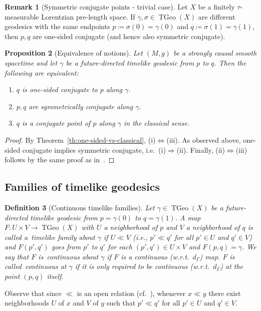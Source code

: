 \documentclass[a4paper,11pt]{article}
\numberwithin{equation}{section}
\theoremstyle{plain}
\newtheorem{Definition}{Definition}[section]
\newtheorem{Proposition}[Definition]{Proposition}
\theoremstyle{definition}
\newtheorem{Remark}[Definition]{Remark}
\DeclareMathOperator{\TGeo}{TGeo}
\begin{document}
\begin{Remark}[Symmetric conjugate points - trivial case]
Let $X$ be a finitely $\tau$-measurable
Lorentzian pre-length space. If $\gamma, \sigma \in \TGeo(X)$ are different geodesics with the same endpoints $p \coloneqq \sigma(0) = \gamma(0)$ and $q \coloneqq \sigma(1) = \gamma(1)$, then $p,q$ are one-sided conjugate (and hence also symmetric conjugate).
\end{Remark}


\begin{Proposition}[Equivalence of notions]\label{prop:equivalence_of_conjugate_notions}
Let $(M,g)$ be a strongly causal smooth spacetime and let $\gamma$ be a future-directed timelike geodesic from $p$ to $q$. Then the following are equivalent:
\begin{enumerate}
    \item[(i)] $q$ is one-sided conjugate to $p$ along $\gamma$.
    \item[(ii)] $p,q$ are symmetrically conjugate along $\gamma$.
    \item[(iii)] $q$ is a conjugate point of $p$ along $\gamma$ in the classical sense.
\end{enumerate}
\end{Proposition}
\begin{proof}
By Theorem~\ref{th:one-sided-vs-classical}, (i)$\Leftrightarrow$(iii). As observed above, one-sided conjugate implies symmetric conjugate, i.e.\ (i)$\Rightarrow$(ii). Finally, (ii)$\Leftrightarrow$(iii) follows by the same 
proof as in~\cite[Thm.\ 2.6]{shankar2009conjugate}.
\end{proof}

\subsection{Families of timelike geodesics}
\label{subsection: Families of timelike geodesics}

\begin{Definition}[Continuous timelike families]
Let $\gamma\in \TGeo(X)$ be a future-directed timelike geodesic from $p=\gamma(0)$ to $q=\gamma(1)$. A map $F \colon U\times V\to \TGeo(X)$
with $U$ a neighborhood of $p$ and $V$ a neighborhood of $q$ is called a~\emph{timelike family about $\gamma$\/} if 
$U\ll V$ (i.e., $p' \ll q'$ for all $p' \in U$ and $q' \in V$) and $F(p',q')$ goes from $p'$ to $q'$ for each $(p',q')\in U\times V$
and $F(p,q)=\gamma$. 
We say that $F$ is~\emph{continuous about\/} $\gamma$ if $F$ is a continuous (w.r.t.\ $d_{\Gamma}$) map.
$F$ is called~\emph{continuous at\/} $\gamma$ if it is only required to be continuous (w.r.t.\ $d_{\Gamma}$) at the point $(p,q)$ itself.
\end{Definition}
Observe that since $\ll$ is an open relation (cf.~\cite[Prop.\ 2.13]{kunzinger2018lorentzian}), whenever $x\ll y$ there exist neighborhoods $U$ of $x$ and $V$ of $y$ such that $p' \ll q'$ for all $p' \in U$ and $q' \in V$.
\end{document}
